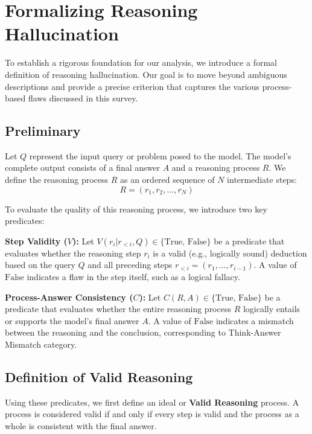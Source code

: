 \vspace{-2mm}\section{Formalizing Reasoning Hallucination}\vspace{-1mm}
\label{sec:definition}

To establish a rigorous foundation for our analysis, we introduce a formal definition of reasoning hallucination. Our goal is to move beyond ambiguous descriptions and provide a precise criterion that captures the various process-based flaws discussed in this survey.

\subsection{Preliminary}

Let $Q$ represent the input query or problem posed to the model. The model's complete output consists of a final answer $A$ and a reasoning process $R$. We define the reasoning process $R$ as an ordered sequence of $N$ intermediate steps:
$$R = (r_1, r_2, \dots, r_N)$$

To evaluate the quality of this reasoning process, we introduce two key predicates:

\textbf{Step Validity ($V$):} Let $V(r_i | r_{<i}, Q) \in \{\text{True, False}\}$ be a predicate that evaluates whether the reasoning step $r_i$ is a valid (e.g., logically sound) deduction based on the query $Q$ and all preceding steps $r_{<i} = (r_1, \dots, r_{i-1})$. A value of $\text{False}$ indicates a flaw in the step itself, such as a logical fallacy.

\textbf{Process-Answer Consistency ($C$):} Let $C(R, A) \in \{\text{True, False}\}$ be a predicate that evaluates whether the entire reasoning process $R$ logically entails or supports the model's final answer $A$. A value of $\text{False}$ indicates a mismatch between the reasoning and the conclusion, corresponding to Think-Answer Mismatch category.

\subsection{Definition of Valid Reasoning}

Using these predicates, we first define an ideal or \textbf{Valid Reasoning} process. A process is considered valid if and only if every step is valid and the process as a whole is consistent with the final answer.

